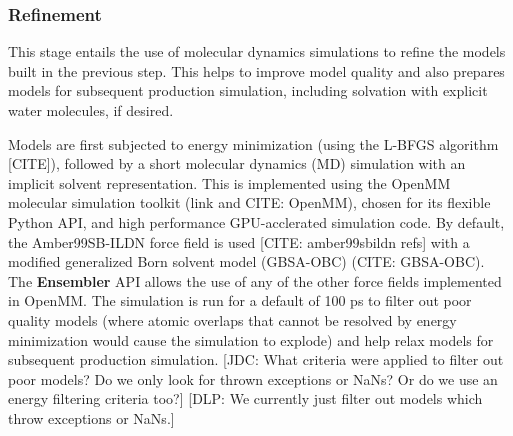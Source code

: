 \documentclass[aps,pre,twocolumn,nofootinbib,superscriptaddress,linenumbers]{revtex4-1}
\begin{document}
\subsubsection{Refinement}

This stage entails the use of molecular dynamics simulations to refine the models built in the previous step.
This helps to improve model quality and also prepares models for subsequent production simulation, including solvation with explicit water molecules, if desired.

Models are first subjected to energy minimization (using the L-BFGS algorithm {\color{red}[CITE]}), followed by a short molecular dynamics (MD) simulation with an implicit solvent representation.
This is implemented using the OpenMM molecular simulation toolkit (link and CITE: OpenMM), chosen for its flexible Python API, and high performance GPU-acclerated simulation code.
By default, the Amber99SB-ILDN force field is used {\color{red}[CITE: amber99sbildn refs]} with a modified generalized Born solvent model (GBSA-OBC) (CITE: GBSA-OBC).
The {\bf Ensembler} API allows the use of any of the other force fields implemented in OpenMM.
The simulation is run for a default of 100 ps to filter out poor quality models (where atomic overlaps that cannot be resolved by energy minimization would cause the simulation to explode) and help relax models for subsequent production simulation.
{\color{red}[JDC: What criteria were applied to filter out poor models?  Do we only look for thrown exceptions or NaNs?  Or do we use an energy filtering criteria too?]}
{\color{blue}[DLP: We currently just filter out models which throw exceptions or NaNs.]}
\end{document}
